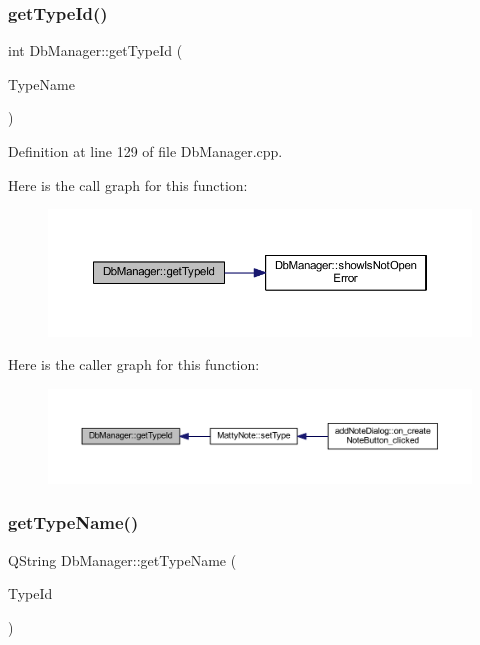 \subsubsection{\texorpdfstring{get\+Type\+Id()}{getTypeId()}}
{\footnotesize\ttfamily int Db\+Manager\+::get\+Type\+Id (\begin{DoxyParamCaption}\item[{const Q\+String \&}]{Type\+Name }\end{DoxyParamCaption})\hspace{0.3cm}{\ttfamily [static]}}



Definition at line 129 of file Db\+Manager.\+cpp.

Here is the call graph for this function\+:
\nopagebreak
\begin{figure}[H]
\begin{center}
\leavevmode
\includegraphics[width=350pt]{classDbManager_a92ebefd0d5fae643db1fc51cc7ea0c31_cgraph}
\end{center}
\end{figure}
Here is the caller graph for this function\+:
\nopagebreak
\begin{figure}[H]
\begin{center}
\leavevmode
\includegraphics[width=350pt]{classDbManager_a92ebefd0d5fae643db1fc51cc7ea0c31_icgraph}
\end{center}
\end{figure}
\hypertarget{classDbManager_a6cb58e12049873e8b1b4b6ecd74dbfb6}{}\label{classDbManager_a6cb58e12049873e8b1b4b6ecd74dbfb6} 
\subsubsection{\texorpdfstring{get\+Type\+Name()}{getTypeName()}}
{\footnotesize\ttfamily Q\+String Db\+Manager\+::get\+Type\+Name (\begin{DoxyParamCaption}\item[{int}]{Type\+Id }\end{DoxyParamCaption})\hspace{0.3cm}{\ttfamily [static]}}



